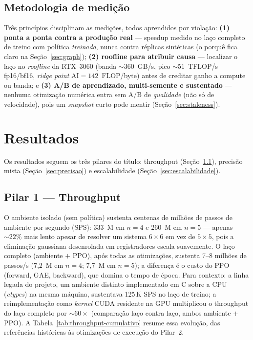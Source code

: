 \documentclass[12pt]{article}
\begin{document}
\subsection{Metodologia de medição}\label{sec:medicao}

Três princípios disciplinam as medições, todos aprendidos por violação:
\textbf{(1) ponta a ponta contra a produção real} --- speedup medido no laço
completo de treino com política \emph{treinada}, nunca contra réplicas
sintéticas (o porquê fica claro na Seção~\ref{sec:graph}); \textbf{(2) roofline para atribuir causa} ---
localizar o laço no \emph{roofline} da RTX~3060 (banda ${\sim}360$~GB/s, pico
${\sim}51$~TFLOP/s fp16/bf16, \emph{ridge point} $\mathrm{AI}=142$~FLOP/byte)
antes de creditar ganho a compute ou banda; e \textbf{(3) A/B de aprendizado,
multi-semente e sustentado} --- nenhuma otimização numérica entra sem A/B de
\emph{qualidade} (não só de velocidade), pois um \emph{snapshot} curto pode
mentir (Seção~\ref{sec:staleness}).

\section{Resultados}\label{sec:resultados}

Os resultados seguem os três pilares do título: throughput
(Seção~\ref{sec:throughput}), precisão mista (Seção~\ref{sec:precisao}) e
escalabilidade (Seção~\ref{sec:escalabilidade}).

\subsection{Pilar 1 --- Throughput}\label{sec:throughput}

O ambiente isolado (sem política) sustenta centenas de milhões de passos de
ambiente por segundo (SPS): 333~M em $n{=}4$ e 260~M em $n{=}5$ --- apenas ${\sim}22\%$ mais lento
apesar de resolver um sistema $6\times6$ em vez de $5\times5$, pois a
eliminação gaussiana desenrolada em registradores escala suavemente. O laço
completo (ambiente $+$ PPO), após todas as otimizações, sustenta 7--8 milhões
de passos/s (7,2~M em $n{=}4$; 7,7~M em $n{=}5$); a diferença é o custo do PPO
(forward, GAE, backward), que domina o tempo de época. Para contexto: a linha
legada do projeto, um ambiente distinto implementado em C sobre a CPU
(\emph{ctypes}) na mesma máquina, sustentava 125\,K SPS no laço de treino; a
reimplementação como \emph{kernel} CUDA residente na GPU multiplicou o
throughput do laço completo por ${\sim}60\times$ (comparação laço contra laço,
ambos ambiente $+$ PPO). A Tabela~\ref{tab:throughput-cumulativo} resume essa
evolução, das referências históricas às otimizações de execução do Pilar~2.
\end{document}
